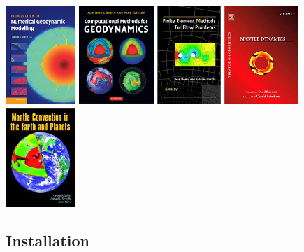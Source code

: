 \documentclass[a4paper]{article}
\begin{document}
\begin{center}
\includegraphics[height=3.74cm]{images/literature/gerya_book}
\includegraphics[height=3.74cm]{images/literature/tackley_book}
\includegraphics[height=3.74cm]{images/literature/donea_huerta_book}
\includegraphics[height=3.74cm]{images/literature/bercovici_book}
\includegraphics[height=3.74cm]{images/literature/sto_book}\\
\end{center}

\subsection{Installation}
\end{document}

